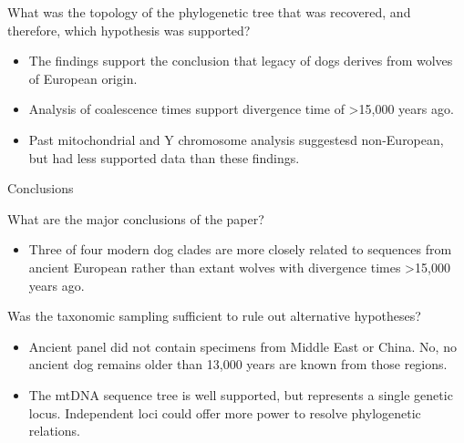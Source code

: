 \documentclass[12pt,a4paper]{article}
\begin{document}
\begin{itemize}
\begin{itemize}
\begin{itemize}
                \end{itemize}
            {\color{darklc} \item What was the topology of the phylogenetic tree that was recovered, and therefore, which hypothesis was supported?}
                \begin{itemize}
                    \item The findings support the conclusion that legacy of dogs derives from wolves of European origin.
                    \item Analysis of coalescence times support divergence time of >15,000 years ago.
                    \item Past mitochondrial and Y chromosome analysis suggestesd non-European, but had less supported data than these findings.
                \end{itemize}
        \end{itemize}
    \item Conclusions
        \begin{itemize}
            {\color{darklc} \item  What are the major conclusions of the paper?}
                \begin{itemize}
                    \item Three of four modern dog clades are more closely related to sequences from ancient European rather than extant wolves with divergence times >15,000 years ago.
                \end{itemize}
            {\color{darklc} \item  Was the taxonomic sampling sufficient to rule out alternative hypotheses? }
                \begin{itemize}
                    \item Ancient panel did not contain specimens from Middle East or China. No, no ancient dog remains older than 13,000 years are known from those regions.
                    \item The mtDNA sequence tree is well supported, but represents a single genetic locus. Independent loci could offer more power to resolve phylogenetic relations.
                \end{itemize}
        \end{itemize}
\end{itemize}
\end{document}
